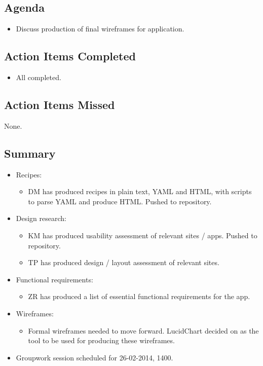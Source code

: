 \documentclass{article}
\begin{document}
\subsection*{Agenda}
\begin{itemize}
\item Discuss production of final wireframes for application.
\end{itemize}

\subsection*{Action Items Completed}
\begin{itemize}
\item All completed.
\end{itemize}

\subsection*{Action Items Missed}
None.

\subsection*{Summary}
\begin{itemize}
\item Recipes:
  \begin{itemize}
  \item DM has produced recipes in plain text, YAML and HTML, with scripts to parse YAML and produce HTML. Pushed to repository.
  \end{itemize}
\item Design research:
  \begin{itemize}
  \item KM has produced usability assessment of relevant sites / apps. Pushed to repository.
  \item TP has produced design / layout assessment of relevant sites.
  \end{itemize}
\item Functional requirements:
  \begin{itemize}
  \item ZR has produced a list of essential functional requirements for the app.
  \end{itemize}
\item Wireframes:
  \begin{itemize}
  \item Formal wireframes needed to move forward. LucidChart decided on as the tool to be used for producing these wireframes.
  \end{itemize}
\item Groupwork session scheduled for 26-02-2014, 1400.
\end{itemize}
\end{document}
